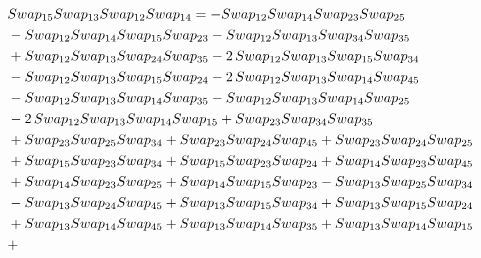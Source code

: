 \documentclass[10pt,a4paper]{amsart}
\begin{document}
\begin{align*}
&\textnormal{Swap}_{15}   \textnormal{Swap}_{13}   \textnormal{Swap}_{12}   \textnormal{Swap}_{14} = -\textnormal{Swap}_{12} \textnormal{Swap}_{14} \textnormal{Swap}_{23} \textnormal{Swap}_{25}\\ & - \textnormal{Swap}_{12} \textnormal{Swap}_{14} \textnormal{Swap}_{15} \textnormal{Swap}_{23} - \textnormal{Swap}_{12} \textnormal{Swap}_{13} \textnormal{Swap}_{34} \textnormal{Swap}_{35}\\ & + \textnormal{Swap}_{12} \textnormal{Swap}_{13} \textnormal{Swap}_{24} \textnormal{Swap}_{35} -
        2\,\textnormal{Swap}_{12} \textnormal{Swap}_{13} \textnormal{Swap}_{15} \textnormal{Swap}_{34}\\ & - \textnormal{Swap}_{12} \textnormal{Swap}_{13} \textnormal{Swap}_{15} \textnormal{Swap}_{24} - 2\,\textnormal{Swap}_{12} \textnormal{Swap}_{13} \textnormal{Swap}_{14} \textnormal{Swap}_{45}\\ & -
        \textnormal{Swap}_{12} \textnormal{Swap}_{13} \textnormal{Swap}_{14} \textnormal{Swap}_{35} - \textnormal{Swap}_{12} \textnormal{Swap}_{13} \textnormal{Swap}_{14} \textnormal{Swap}_{25}\\ & - 2\,\textnormal{Swap}_{12} \textnormal{Swap}_{13} \textnormal{Swap}_{14} \textnormal{Swap}_{15} + \textnormal{Swap}_{23} \textnormal{Swap}_{34} \textnormal{Swap}_{35}\\ & +
        \textnormal{Swap}_{23} \textnormal{Swap}_{25} \textnormal{Swap}_{34} + \textnormal{Swap}_{23} \textnormal{Swap}_{24} \textnormal{Swap}_{45} + \textnormal{Swap}_{23} \textnormal{Swap}_{24} \textnormal{Swap}_{25}\\ & + \textnormal{Swap}_{15} \textnormal{Swap}_{23} \textnormal{Swap}_{34} + \textnormal{Swap}_{15} \textnormal{Swap}_{23} \textnormal{Swap}_{24} +
        \textnormal{Swap}_{14} \textnormal{Swap}_{23} \textnormal{Swap}_{45}\\ & + \textnormal{Swap}_{14} \textnormal{Swap}_{23} \textnormal{Swap}_{25} + \textnormal{Swap}_{14} \textnormal{Swap}_{15} \textnormal{Swap}_{23} - \textnormal{Swap}_{13} \textnormal{Swap}_{25} \textnormal{Swap}_{34}\\ & - \textnormal{Swap}_{13} \textnormal{Swap}_{24} \textnormal{Swap}_{45} +
        \textnormal{Swap}_{13} \textnormal{Swap}_{15} \textnormal{Swap}_{34} + \textnormal{Swap}_{13} \textnormal{Swap}_{15} \textnormal{Swap}_{24}\\ & + \textnormal{Swap}_{13} \textnormal{Swap}_{14} \textnormal{Swap}_{45} + \textnormal{Swap}_{13} \textnormal{Swap}_{14} \textnormal{Swap}_{35} + \textnormal{Swap}_{13} \textnormal{Swap}_{14} \textnormal{Swap}_{15}\\ & +

\end{align*}
\end{document}
